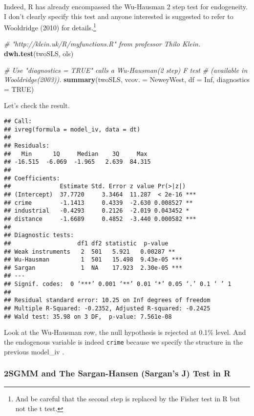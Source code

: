 \documentclass[
  12pt,
]{article}
\newenvironment{Shaded}{\begin{snugshade}}{\end{snugshade}}
\newcommand{\CommentTok}[1]{\textcolor[rgb]{0.56,0.35,0.01}{\textit{#1}}}
\newcommand{\DataTypeTok}[1]{\textcolor[rgb]{0.13,0.29,0.53}{#1}}
\newcommand{\KeywordTok}[1]{\textcolor[rgb]{0.13,0.29,0.53}{\textbf{#1}}}
\newcommand{\NormalTok}[1]{#1}
\newcommand{\OtherTok}[1]{\textcolor[rgb]{0.56,0.35,0.01}{#1}}
\begin{document}
Indeed, R has already encompassed the Wu-Hausman 2 step test for endogeneity. I don't clearly specify this test and anyone interested is suggested to refer to Wooldridge (2010) for details.\footnote{And be careful that the second step is replaced by the Fisher test in R but not the t test.}

\begin{Shaded}
\begin{Highlighting}[]
\CommentTok{\# "http://klein.uk/R/myfunctions.R" from professor Thilo Klein.}
\KeywordTok{dwh.test}\NormalTok{(twoSLS, ols) }

\CommentTok{\# Use "diagnostics = TRUE" calls a Wu{-}Hausman(2 step) F test}
\CommentTok{\# (available in Wooldridge(2003)).}
\KeywordTok{summary}\NormalTok{(twoSLS, }\DataTypeTok{vcov. =}\NormalTok{ NeweyWest, }\DataTypeTok{df =} \OtherTok{Inf}\NormalTok{, }\DataTypeTok{diagnostics =} \OtherTok{TRUE}\NormalTok{)}
\end{Highlighting}
\end{Shaded}

Let's check the result.

\begin{verbatim}
## Call:
## ivreg(formula = model_iv, data = dt)
##
## Residuals:
##   Min      1Q     Median    3Q     Max 
## -16.515  -6.069  -1.965   2.639  84.315 
##
## Coefficients:
##              Estimate Std. Error z value Pr(>|z|)    
## (Intercept)  37.7720     3.3464  11.287  < 2e-16 ***
## crime        -1.1413     0.4339  -2.630 0.008527 ** 
## industrial   -0.4293     0.2126  -2.019 0.043452 *  
## distance     -1.6689     0.4852  -3.440 0.000582 ***
##
## Diagnostic tests:
##                   df1 df2 statistic  p-value    
## Weak instruments   2  501   5.921   0.00287 ** 
## Wu-Hausman         1  501   15.498  9.43e-05 ***
## Sargan             1  NA    17.923  2.30e-05 ***
## ---
## Signif. codes:  0 ‘***’ 0.001 ‘**’ 0.01 ‘*’ 0.05 ‘.’ 0.1 ‘ ’ 1
##
## Residual standard error: 10.25 on Inf degrees of freedom
## Multiple R-Squared: -0.2352, Adjusted R-squared: -0.2425 
## Wald test: 35.98 on 3 DF,  p-value: 7.561e-08 
\end{verbatim}

Look at the Wu-Hausman row, the null hypothesis is rejected at 0.1\% level. And the endogenous variable is indeed \texttt{crime} because we specify the structure in the previous \color{blue} model\_iv \color{black}.

\hypertarget{sgmm-and-the-sargan-hansen-sargans-j-test-in-r}{%
\subsubsection{2SGMM and The Sargan-Hansen (Sargan's J) Test in R}\label{sgmm-and-the-sargan-hansen-sargans-j-test-in-r}}
\end{document}

